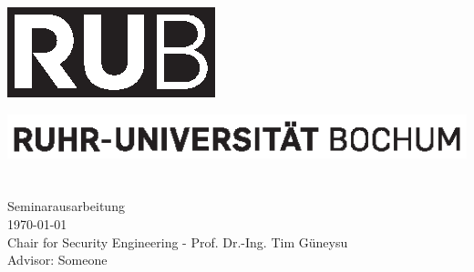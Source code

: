 %
%

\frontmatter

\begin{titlepage}
 \enlargethispage{3cm}
 \vspace*{-32mm}\hspace*{120mm}
 \includegraphics[scale=1.0]{rub_logo.eps}
 
 \vspace*{11cm}\hspace*{0mm}
 \begin{minipage}[b]{1\linewidth}
  \sffamily
  \hspace{-17.2mm}\includegraphics[scale=1.0]{rub_slogan.eps}\\
  
  \nohyphens{
   {\bfseries \LARGE \sffamily {\thtitle}}
  }\\
  
  \large{
   \thauthor
  }\\
  
  \vspace*{35mm}
  \normalsize{
   Seminarausarbeitung\\
   \today\\
   Chair for Security Engineering - Prof. Dr.-Ing. Tim G{\"u}neysu\\
	 Advisor: Someone
  }
 \end{minipage}
\end{titlepage}


\newpage\thispagestyle{empty}
